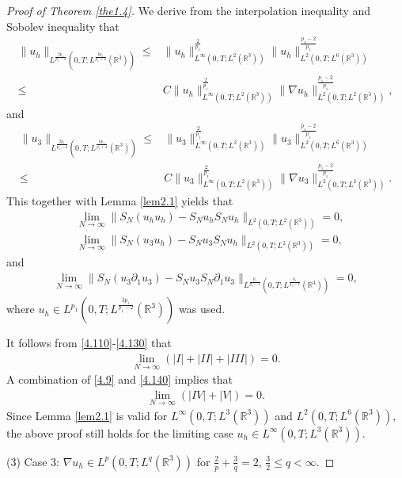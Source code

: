 \documentclass[11pt]{article}
\theoremstyle{plain}\newtheorem{definition}{Definition}[section]
\theoremstyle{definition}\newtheorem{theorem}{Theorem}[section]
\theoremstyle{plain}\newtheorem{lemma}[theorem]{Lemma}
\theoremstyle{plain}\newtheorem{coro}[theorem]{Corollary}
\theoremstyle{plain}\newtheorem{prop}[theorem]{Proposition}
\theoremstyle{remark}\newtheorem{remark}{Remark}[section]
\newcommand{\be}{\begin{equation}}
\newcommand{\ee}{\end{equation}}
\newcommand{\ba}{\begin{aligned}}
\newcommand{\ea}{\end{aligned}}
\newcommand{\f}{\frac}
\numberwithin{equation}{section}
\begin{document}
\begin{proof}[Proof of Theorem \ref{the1.4}]
 We derive from the interpolation inequality and Sobolev inequality that
\be\ba\label{4.110}
\|u_{h}\|_{L^{\f{2p_{1}}{p_{1}-2}}(0,T;L^{\f{6p_{1}}{p_{1}+4}}(\mathbb{R}^{3}))}
\leq&  \|u_{h}\|^{  \f{ 2}{p_1}}_{L^{\infty}(0,T;L^{2}(\mathbb{R}^{3}))}\|u_{h}\|_{L^{2}(0,T;L^{6}(\mathbb{R}^{3}))}
^{  \f{p_1-2}{p_1}}
\\
\leq& C  \|u_{h}\|^{  \f{ 2}{p_1}}_{L^{\infty}(0,T;L^{2}(\mathbb{R}^{3}))}\|\nabla u_{h}\|_{L^{2}(0,T;L^{2}(\mathbb{R}^{3}))}^{  \f{p_1-2}{p_1}},
\ea\ee
and
\be\ba
\|u_{3}\|_{L^{\f{2p_{1}}{p_{1}-2}}(0,T;L^{\f{6p_{1}}{p_{1}+4}}(\mathbb{R}^{3}))}
\leq&  \|u_{3}\|^{  \f{ 2}{p_1}}_{L^{\infty}(0,T;L^{2}(\mathbb{R}^{3}))}\|u_{3}\|_{L^{2}(0,T;L^{6}(\mathbb{R}^{3}))}
^{  \f{p_1-2}{p_1}}\\
\leq& C  \|u_{3}\|^{  \f{ 2}{p_1}}_{L^{\infty}(0,T;L^{2}(\mathbb{R}^{3}))}\|\nabla u_{3}\|_{L^{2}(0,T;L^{2}(\mathbb{R}^{3}))}^{  \f{p_1-2}{p_1}}.
\ea\ee
This together with
Lemma \ref{lem2.1} yields that
\be\ba\label{4.130}
&\lim_{N\rightarrow\infty}
\|S_{N}(u_{h}u_{h} )-S_{N} u_{h}S_{N}u_{h}\|_{L^{2}(0,T;L^{2}(\mathbb{R}^{3}))}=0,\\
&\lim_{N\rightarrow\infty}
\|S_{N}(u_{3}u_{h} )-S_{N} u_{3}S_{N}u_{h}\|_{L^{2}(0,T;L^{2}(\mathbb{R}^{3}))}=0,
\ea\ee
and
\be\ba\label{4.140}
\lim_{N\rightarrow\infty}\|S_{N}(u_{3}\partial_{1}u_{3} )-S_{N} u_{3}S_{N}\partial_{1}u_{3}\|_{L^{\f{p_{1}}{p_{1}-1}}(0,T;L^{\f{q_{1}}{q_{1}-1}}(\mathbb{R}^{3}))}
=0,
\ea\ee
where
$u_{h}\in L^{p_{1}}(0,T;L^{\f{3p_{1}}{p_{1}-2}}(\mathbb{R}^{3}))$ was used.

It follows from  \eqref{4.110}-\eqref{4.130} that
$$\ba
\lim_{N\rightarrow\infty}(|I |+|II|+|III|)=0.
\ea$$
A combination of \eqref{4.9} and \eqref{4.140} implies that
$$\ba
\lim_{N\rightarrow\infty}(|IV|+|V|)=0.
\ea$$
Since Lemma \ref{lem2.1} is valid for  $ L^{\infty}(0,T;L^{3 }(\mathbb{R}^{3})) $ and $ L^{2}(0,T;L^{6}(\mathbb{R}^{3})) $, the above proof still holds for the limiting case
$u_{h}\in L^{\infty}(0,T;L^{3}(\mathbb{R}^{3}))$.

(3) Case 3: $\nabla u_{h}\in L^{p }(0,T;L^{q }(\mathbb{R}^{3}))$ for $\f{2}{p }+\f{3}{q }=2$, $\f32\leq q <\infty.$


\end{proof}
\end{document}
